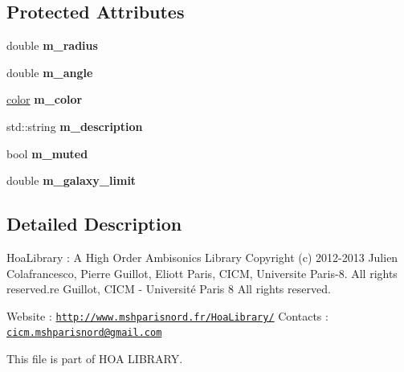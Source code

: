\subsection*{Protected Attributes}
\begin{DoxyCompactItemize}
\item 
\hypertarget{class_star_a687d043aec32f3851a6d07cb37bd5f60}{double {\bfseries m\-\_\-radius}}\label{class_star_a687d043aec32f3851a6d07cb37bd5f60}

\item 
\hypertarget{class_star_ac60a93823c3e79224202fd0e77654a83}{double {\bfseries m\-\_\-angle}}\label{class_star_ac60a93823c3e79224202fd0e77654a83}

\item 
\hypertarget{class_star_abd432e9947bf22fdd6dce0449017be00}{\hyperlink{structcolor}{color} {\bfseries m\-\_\-color}}\label{class_star_abd432e9947bf22fdd6dce0449017be00}

\item 
\hypertarget{class_star_a2b9dcdf04555f124c7730c2f2eedbbe2}{std\-::string {\bfseries m\-\_\-description}}\label{class_star_a2b9dcdf04555f124c7730c2f2eedbbe2}

\item 
\hypertarget{class_star_a8fdf5f31524c641c2a976be91104f3d2}{bool {\bfseries m\-\_\-muted}}\label{class_star_a8fdf5f31524c641c2a976be91104f3d2}

\item 
\hypertarget{class_star_a8bb66e389333e5ae54bb90264d87e043}{double {\bfseries m\-\_\-galaxy\-\_\-limit}}\label{class_star_a8bb66e389333e5ae54bb90264d87e043}

\end{DoxyCompactItemize}


\subsection{Detailed Description}
Hoa\-Library \-: A High Order Ambisonics Library Copyright (c) 2012-\/2013 Julien Colafrancesco, Pierre Guillot, Eliott Paris, C\-I\-C\-M, Universite Paris-\/8. All rights reserved.\-re Guillot, C\-I\-C\-M -\/ Université Paris 8 All rights reserved.

Website \-: \href{http://www.mshparisnord.fr/HoaLibrary/}{\tt http\-://www.\-mshparisnord.\-fr/\-Hoa\-Library/} Contacts \-: \href{mailto:cicm.mshparisnord@gmail.com}{\tt cicm.\-mshparisnord@gmail.\-com}

This file is part of H\-O\-A L\-I\-B\-R\-A\-R\-Y.

